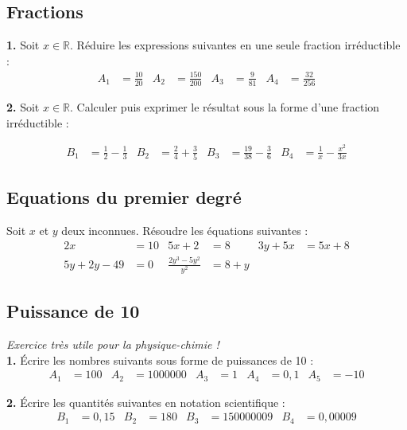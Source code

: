 \subsection{Fractions}
\textbf{1.} Soit $x\in\mathbb{R}$. Réduire les expressions suivantes en une seule fraction irréductible :
\vspace{-0.2cm}
\begin{align*}
A_1 & = \frac{10}{20} & A_2 & = \frac{150}{200} & A_3 &= \frac{9}{81} & A_4 & = \frac{32}{256}
\end{align*}

\textbf{2.} Soit $x\in\mathbb{R}$. Calculer puis exprimer le résultat sous la forme d'une fraction irréductible :

\begin{align*}
    B_1 &= \frac{1}{2}-\frac{1}{3} & B_2 &= \frac{2}{4}+\frac{3}{5} & B_3 &= \frac{19}{38}-\frac{3}{6} & B_4 &= \frac{1}{x}-\frac{x^2}{3x}
\end{align*}

\subsection{Equations du premier degré}
Soit $x$ et $y$ deux inconnues. Résoudre les équations suivantes :
\begin{align*}
    2x &= 10 & 5x+2 &= 8 & 3y + 5x &= 5x + 8 \\
    5y + 2y - 49 &= 0 & \frac{2y^3-5y^2}{y^2} &= 8+y & 
\end{align*}

\subsection{Puissance de 10}
\textit{Exercice très utile pour la physique-chimie !} \\

\textbf{1.} \'{E}crire les nombres suivants sous forme de puissances de 10 :
\vspace{-0.2cm}
\begin{align*}
    A_1 &= 100 & A_2 &= 1 000 000 & A_3 &= 1 & A_4 &= 0, 1 & A_5 &= -10
\end{align*}

\textbf{2.} \'{E}crire les quantités suivantes en notation scientifique :
\vspace{-0.2cm}
\begin{align*}
    B_1 &= 0,15 & B_2 &= 180 & B_3 &= 150 000 009 & B_4 &= 0,00009
\end{align*}

